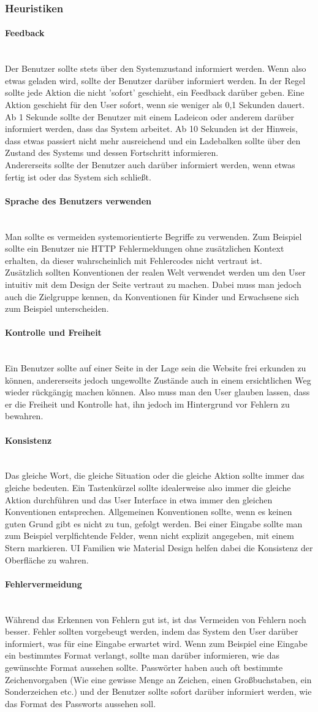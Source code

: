 \documentclass{article}
\newcommand{\paragraphlb}[1]{\paragraph{#1}\mbox{}\\}
\begin{document}
	\subsubsection{Heuristiken}
	\paragraphlb{Feedback}
	Der Benutzer sollte stets über den Systemzustand informiert werden. Wenn also etwas geladen wird, sollte der Benutzer darüber informiert werden. In der Regel sollte jede Aktion die nicht 'sofort' geschieht, ein Feedback darüber geben. Eine Aktion geschieht für den User sofort, wenn sie weniger als 0,1 Sekunden dauert. Ab 1 Sekunde sollte der Benutzer mit einem Ladeicon oder anderem darüber informiert werden, dass das System arbeitet. Ab 10 Sekunden ist der Hinweis, dass etwas passiert nicht mehr ausreichend und ein Ladebalken sollte über den Zustand des Systems und dessen Fortschritt informieren. \\
	Andererseits sollte der Benutzer auch darüber informiert werden, wenn etwas fertig ist oder das System sich schließt.
	\paragraphlb{Sprache des Benutzers verwenden}
	Man sollte es vermeiden systemorientierte Begriffe zu verwenden. Zum Beispiel sollte ein Benutzer nie HTTP Fehlermeldungen ohne zusätzlichen Kontext erhalten, da dieser wahrscheinlich mit Fehlercodes nicht vertraut ist. \\
	Zusätzlich sollten Konventionen der realen Welt verwendet werden um den User intuitiv mit dem Design der Seite vertraut zu machen. Dabei muss man jedoch auch die Zielgruppe kennen, da Konventionen für Kinder und Erwachsene sich zum Beispiel unterscheiden.
	\paragraphlb{Kontrolle und Freiheit}
	Ein Benutzer sollte auf einer Seite in der Lage sein die Website frei erkunden zu können, andererseits jedoch ungewollte Zustände auch in einem ersichtlichen Weg wieder rückgängig machen können. Also muss man den User glauben lassen, dass er die Freiheit und Kontrolle hat, ihn jedoch im Hintergrund vor Fehlern zu bewahren.
	\paragraphlb{Konsistenz}
	Das gleiche Wort, die gleiche Situation oder die gleiche Aktion sollte immer das gleiche bedeuten. Ein Tastenkürzel sollte idealerweise also immer die gleiche Aktion durchführen und das User Interface in etwa immer den gleichen Konventionen entsprechen. Allgemeinen Konventionen sollte, wenn es keinen guten Grund gibt es nicht zu tun, gefolgt werden. Bei einer Eingabe sollte man zum Beispiel verplfichtende Felder, wenn nicht explizit angegeben, mit einem Stern markieren. UI Familien wie Material Design helfen dabei die Konsistenz der Oberfläche zu wahren.
	\paragraphlb{Fehlervermeidung}
	Während das Erkennen von Fehlern gut ist, ist das Vermeiden von Fehlern noch besser. Fehler sollten vorgebeugt werden, indem das System den User darüber informiert, was für eine Eingabe erwartet wird. Wenn zum Beispiel eine Eingabe ein bestimmtes Format verlangt, sollte man darüber informieren, wie das gewünschte Format aussehen sollte. Passwörter haben auch oft bestimmte Zeichenvorgaben (Wie eine gewisse Menge an Zeichen, einen Großbuchstaben, ein Sonderzeichen etc.) und der Benutzer sollte sofort darüber informiert werden, wie das Format des Passworts aussehen soll.
\end{document}
